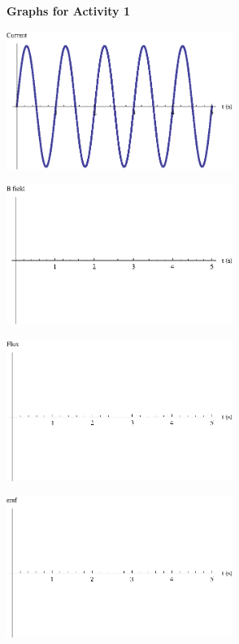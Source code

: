 \begin{center}

{\bf Graphs for Activity 1}

\vfil

\includegraphics[width=2.9in]{indfig1.eps}

\includegraphics[width=2.9in]{indfig2.eps}

\includegraphics[width=2.9in]{indfig3.eps}

\includegraphics[width=2.9in]{indfig4.eps}



\vfil

\end{center}


